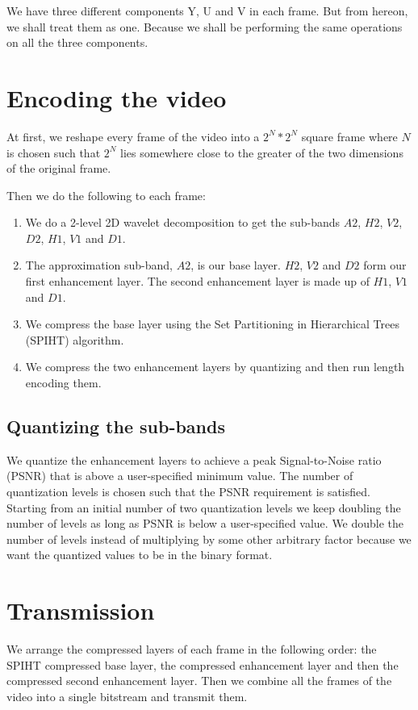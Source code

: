\documentclass[10pt,twocolumn]{article}
\begin{document}
We have three different components Y, U and V in each frame. But from hereon, we shall treat them as one. Because we shall be performing the same operations on all the three components.

\section{Encoding the video}

At first, we reshape every frame of the video into a $2^N * 2^N$ square frame where $N$ is chosen such that $2^N$ lies somewhere close to the greater of the two dimensions of the original frame.

Then we do the following to each frame:
\begin{enumerate}
    \item We do a 2-level 2D wavelet decomposition to get the sub-bands $A2$, $H2$, $V2$, $D2$, $H1$, $V1$ and $D1$.
    \item The approximation sub-band, $A2$, is our base layer. $H2$, $V2$ and $D2$ form our first enhancement layer. The second enhancement layer is made up of $H1$, $V1$ and $D1$.
    \item We compress the base layer using the Set Partitioning in Hierarchical Trees (SPIHT) algorithm\cite{amirSaid1996}.
    \item We compress the two enhancement layers by quantizing and then run length encoding them.
\end{enumerate}

\subsection*{Quantizing the sub-bands}

We quantize the enhancement layers to achieve a peak Signal-to-Noise ratio (PSNR) that is above a user-specified minimum value. The number of quantization levels is chosen such that the PSNR requirement is satisfied. Starting from an initial number of two quantization levels we keep  doubling the number of levels as long as PSNR is below a user-specified value. We double the number of levels instead of multiplying by some other arbitrary factor because we want the quantized values to be in the binary format.

\section{Transmission}

We arrange the compressed layers of each frame in the following order: the SPIHT compressed base layer, the compressed enhancement layer and then the compressed second enhancement layer.
Then we combine all the frames of the video into a single bitstream and transmit them.
\end{document}
